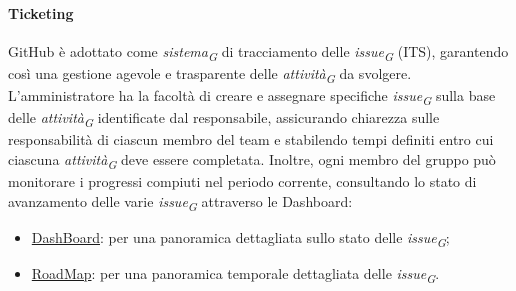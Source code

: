 \hypertarget{par:ticketing}{\paragraph{Ticketing}}
GitHub è adottato come \textit{sistema}\textsubscript{\textit{G}} di tracciamento delle \textit{issue}\textsubscript{\textit{G}} (ITS), garantendo così una gestione agevole e trasparente delle \textit{attività}\textsubscript{\textit{G}} da svolgere. \\
L'amministratore ha la facoltà di creare e assegnare specifiche \textit{issue}\textsubscript{\textit{G}} sulla base delle \textit{attività}\textsubscript{\textit{G}} identificate dal responsabile, assicurando chiarezza sulle responsabilità di ciascun membro del team e stabilendo tempi definiti entro cui ciascuna \textit{attività}\textsubscript{\textit{G}} deve essere completata. Inoltre, ogni membro del gruppo può monitorare i progressi compiuti nel periodo corrente, consultando lo stato di avanzamento delle varie \textit{issue}\textsubscript{\textit{G}} attraverso le Dashboard:
\begin{itemize}
    \item \href{https://github.com/orgs/ByteOps-swe/projects/1}{DashBoard}: per una panoramica dettagliata sullo stato delle \textit{issue}\textsubscript{\textit{G}};
    \item \href{https://github.com/orgs/ByteOps-swe/projects/3}{RoadMap}: per una panoramica temporale dettagliata delle \textit{issue}\textsubscript{\textit{G}}.
\end{itemize}

